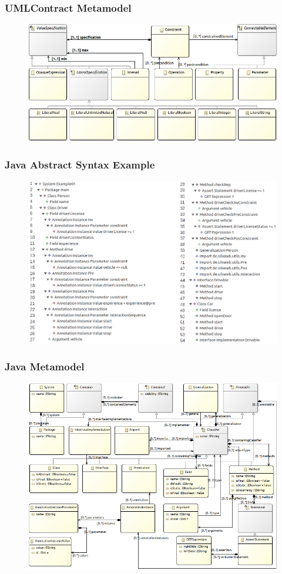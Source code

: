 \documentclass{beamer}
\begin{document}
\begin{frame}[t]
	\frametitle{UMLContract Metamodel}
	\begin{figure}[H]
		\includegraphics[width=\textwidth]{umlContractSimple01}
	\end{figure}
\end{frame}

\begin{frame}[t]
	\frametitle{Java Abstract Syntax Example}
	\vskip -10pt
	\begin{figure}[H]
		\includegraphics[width=\textwidth]{javaMetamodelExample01}
	\end{figure}
\end{frame}

\begin{frame}[t]
	\frametitle{Java Metamodel}
	\vskip -10pt
	\begin{figure}[H]
		\includegraphics[width=.85\textwidth]{javaMetamodel}
	\end{figure}
\end{frame}
\end{document}
